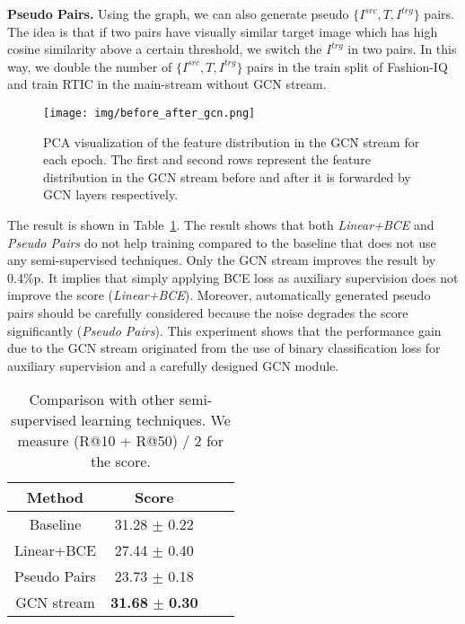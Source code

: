 \documentclass[10pt,twocolumn,letterpaper]{article}
\begin{document}
\noindent
\textbf{Pseudo Pairs.} Using the graph, we can also generate pseudo $\{I^{src}, T, I^{trg}\}$ pairs. The idea is that if two pairs have visually similar target image which has high cosine similarity above a certain threshold, we switch the $I^{trg}$ in two pairs. In this way, we double the number of $\{I^{src}, T, I^{trg}\}$ pairs in the train split of Fashion-IQ and train RTIC in the main-stream without GCN stream.

\begin{figure*}[t]
    \begin{center}
	    \texttt{[image: img/before\_after\_gcn.png]}
	\end{center}
	\caption{PCA visualization of the feature distribution in the GCN stream for each epoch. The first and second rows represent the feature distribution in the GCN stream before and after it is forwarded by GCN layers respectively.}
	\label{fig:before_after_gcn}
\end{figure*}

The result is shown in Table~\ref{tab:semi_baseline}. The result shows that both \textit{Linear+BCE} and \textit{Pseudo Pairs} do not help training compared to the baseline that does not use any semi-supervised techniques. Only the GCN stream improves the result by 0.4\%p. It implies that simply applying BCE loss as auxiliary supervision does not improve the score (\textit{Linear+BCE}). Moreover, automatically generated pseudo pairs should be carefully considered because the noise degrades the score significantly (\textit{Pseudo Pairs}). This experiment shows that the performance gain due to the GCN stream originated from the use of binary classification loss for auxiliary supervision and a carefully designed GCN module.

\begin{table}[H]
    \caption{Comparison with other semi-supervised learning techniques. We measure (R@10 + R@50) / 2 for the score.}
    \centering
    \begin{adjustbox}{width=0.26\textwidth}
    \begin{tabular}{cccc}
        \toprule
        Method          & Score \\ \hline \hline
        Baseline        & 31.28 $\pm$ 0.22 \\
        Linear+BCE      & 27.44 $\pm$ 0.40 \\
        Pseudo Pairs    & 23.73 $\pm$ 0.18 \\
        GCN stream      & \textbf{31.68} $\pm$ \textbf{0.30} \\
        \bottomrule
    \end{tabular}
    \end{adjustbox}
    \label{tab:semi_baseline}
    \end{table}
\end{document}
